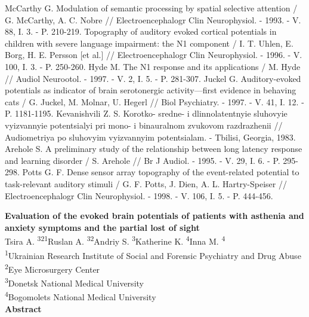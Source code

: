 \documentclass[twocolumn]{article}
\begin{document}
\begin{thebibliography}{35}
McCarthy G. Modulation of semantic processing by spatial selective attention / G. McCarthy, A. C. Nobre  // Electroencephalogr Clin Neurophysiol. - 1993. - V. 88, I. 3. - P. 210-219.
Topography of auditory evoked cortical potentials in children with severe language impairment: the N1 component / I. T. Uhlen, E. Borg, H. E. Persson [et al.] // Electroencephalogr Clin Neurophysiol. - 1996. - V. 100, I. 3. - P. 250-260.
Hyde M. The N1 response and its applications / M. Hyde // Audiol Neurootol. - 1997. - V. 2, I. 5. - P. 281-307.
Juckel G. Auditory-evoked potentials as indicator of brain serotonergic activity—first evidence in behaving cats / G. Juckel, M. Molnar, U. Hegerl // Biol Psychiatry. - 1997. - V. 41, I. 12. - P. 1181-1195.
Kevanishvili Z. S. Korotko- sredne- i dlinnolatentnyie sluhovyie vyizvannyie potentsialyi pri mono- i binauralnom zvukovom razdrazhenii // Audiometriya po sluhovyim vyizvannyim potentsialam. - Tbilisi, Georgia, 1983.
Arehole S. A preliminary study of the relationship between long latency response and learning disorder / S. Arehole // Br J Audiol. - 1995. - V. 29, I. 6. - P. 295-298.
Potts G. F. Dense sensor array topography of the event-related potential to task-relevant auditory stimuli / G. F. Potts, J. Dien, A. L. Hartry-Speiser // Electroencephalogr Clin Neurophysiol. - 1998. - V. 106, I. 5. - P. 444-456.
\end{thebibliography}
\begin{center}
\onecolumn
{\LARGE \bfseries Evaluation of the evoked brain potentials of patients with asthenia and anxiety symptoms and the partial lost of sight}\\[0.5cm]
\large Tsira A. \textsuperscript{3}\textsuperscript{2}\textsuperscript{1}\large Ruslan A. \textsuperscript{3}\textsuperscript{2}\large Andriy S. \textsuperscript{3}\large Katherine K. \textsuperscript{4}\large Inna M. \textsuperscript{4}\\[0.3cm]\textsuperscript{1}Ukrainian Research Institute of Social and Forensic Psychiatry and Drug Abuse\\
\textsuperscript{2}Eye Microsurgery Center\\
\textsuperscript{3}Donetsk National Medical University\\
\textsuperscript{4}Bogomolets National Medical University\\
\vspace{2ex}
{\Large \textbf{Abstract}}\vspace{3ex}\
\end{center}
\end{document}
